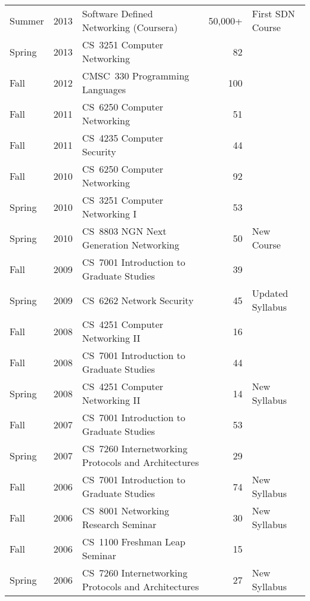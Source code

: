 \begin{center}
\begin{tabular}{lllrl}
Summer & 2013 & Software Defined Networking (Coursera) & 50,000+ & First
SDN Course \\
Spring & 2013 & CS~3251 Computer Networking & 82 \\
Fall & 2012 & CMSC~330 Programming Languages & 100 \\
Fall & 2011 & CS~6250 Computer Networking & 51 \\
Fall & 2011 & CS~4235 Computer Security & 44 \\
Fall & 2010 & CS~6250 Computer Networking & 92 \\
Spring & 2010 & CS~3251 Computer Networking I & 53 \\
Spring & 2010 & CS~8803 NGN Next Generation Networking & 50 & New Course \\
Fall & 2009 & CS~7001 Introduction to Graduate Studies & 39 \\
Spring & 2009 & CS~6262 Network Security & 45 & Updated Syllabus \\
Fall & 2008 & CS~4251 Computer Networking II & 16 & \\
Fall & 2008 & CS~7001 Introduction to Graduate Studies & 44 \\
Spring & 2008 & CS~4251 Computer Networking II & 14 & New Syllabus\\
Fall & 2007 & CS~7001 Introduction to Graduate Studies & 53 \\
Spring & 2007 & CS~7260 Internetworking Protocols and Architectures & 29 \\
Fall & 2006 & CS~7001 Introduction to Graduate Studies & 74 &
New Syllabus \\
Fall & 2006 & CS~8001 Networking Research Seminar & 30 & New Syllabus\\
Fall & 2006 & CS~1100 Freshman Leap Seminar & 15 & \\
Spring & 2006 & CS~7260 Internetworking Protocols and Architectures & 27 &
New Syllabus \\
\end{tabular}
\end{center}

